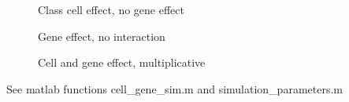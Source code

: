 \documentclass[12pt]{article}
\begin{document}
\begin{figure}
  \caption{Class cell effect, no gene effect}
\end{figure}

\begin{figure}
  \caption{Gene effect, no interaction}
\end{figure}

\begin{figure}
  \caption{ Cell and gene effect, multiplicative}
\end{figure}

See matlab functions cell\_gene\_sim.m and simulation\_parameters.m
\end{document}
